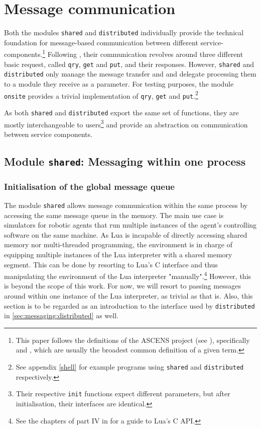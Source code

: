 \chapter{Message communication}

Both the modules \texttt{shared} and \texttt{distributed} individually provide the technical foundation for message-based communication between different service-components.\footnote{This paper follows the definitions of the ASCENS project (see \cite{ASCENS}), specifically \cite{AscensD41} and \cite{HoelzlWirsing2011}, which are usually the broadest common definition of a given term.} Following \cite{AscensD11}, their communication revolves around three different basic request, called \texttt{qry}, \texttt{get} and \texttt{put}, and their responses. However, \texttt{shared} and \texttt{distributed} only manage the message transfer and and delegate processing them to a module they receive as  a parameter. For testing purposes, the module \texttt{onsite} provides a trivial implementation of \texttt{qry}, \texttt{get} and \texttt{put}.\footnote{See appendix \ref{shell} for example programs using \texttt{shared} and \texttt{distributed} respectively.}

As both \texttt{shared} and \texttt{distributed} export the same set of functions, they are mostly interchangeable to users\footnote{Their respective \texttt{init} functions expect different parameters, but after initialisation, their interfaces are identical.} and provide an abstraction on communication between service components.

\section{Module \texttt{shared}: Messaging within one process}
\label{sec:messages:distributed}

\subsection{Initialisation of the global message queue}

The module \texttt{shared} allows message communication within the same process by accessing the same message queue in the memory. The main use case is simulators for robotic agents that run multiple instances of the agent's controlling software on the same machine. As Lua is incapable of directly accessing shared memory nor multi-threaded programming, the environment is in charge of equipping multiple instances of the Lua interpreter with a shared memory segment. This can be done by resorting to Lua's C interface and thus manipulating the environment of the Lua interpreter "manually".\footnote{See the chapters of part IV in \cite{Ierusalimschy2006} for a guide to Lua's C API.} However, this is beyond the scope of this work. For now, we will resort to passing messages around within one instance of the Lua interpreter, as trivial as that is. Also, this section is to be regarded as an introduction to the interface used by \texttt{distributed} in \ref{sec:messaging:distributed} as well.

